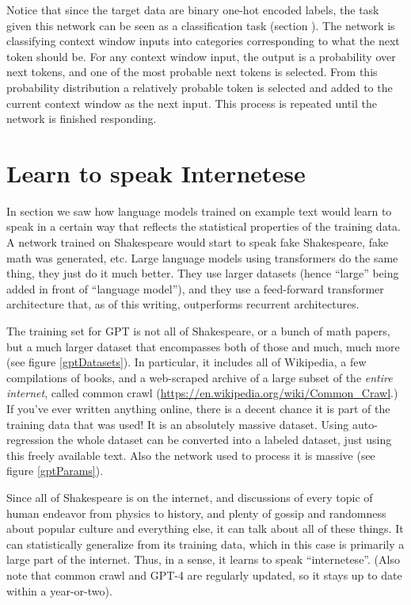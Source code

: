 Notice that since the target data are binary one-hot encoded labels, the task given this network can be seen as a classification task (section ). The network is classifying context window inputs into categories corresponding to what the next token should be.  For any context window input, the output is a probability over next tokens, and one of the most probable next tokens is selected. From this probability distribution a relatively probable token is selected and added to the current context window as the next input. This process is repeated until the network is finished responding.

\section{Learn to speak Internetese}

In section  we saw how language models trained on example text would learn to speak in a certain way that reflects the statistical properties of the training data. A network trained on Shakespeare would start to speak fake Shakespeare, fake math was generated, etc. 
Large language models using transformers do the same thing, they just do it much better. They use larger datasets (hence ``large'' being added in front of ``language model''), and they use a feed-forward transformer architecture that, as of this writing, outperforms recurrent architectures. 

The training set for GPT is not all of Shakespeare, or a bunch of math papers, but a much larger dataset that encompasses both of those and much, much more (see figure \ref{gptDatasets}).  In particular, it includes all of Wikipedia, a few compilations of books, and a web-scraped archive of a large subset of the \emph{entire internet}, called common crawl (\url{https://en.wikipedia.org/wiki/Common_Crawl}.) If you've ever written anything online, there is a decent chance it is part of the training data that was used! It is an absolutely massive dataset. Using auto-regression the whole dataset can be converted into a labeled dataset, just using this freely available text.  Also the network used to process it is massive (see figure \ref{gptParams}). 

Since all of Shakespeare is on the internet, and discussions of every topic of human endeavor from physics to history, and plenty of gossip and randomness about popular culture and everything else, it can talk about all of these things.  It can statistically generalize from its training data, which in this case is primarily a large part of the internet. Thus, in a sense, it learns to speak ``internetese''.  (Also note that common crawl and GPT-4 are regularly updated, so it stays up to date within a year-or-two). 

